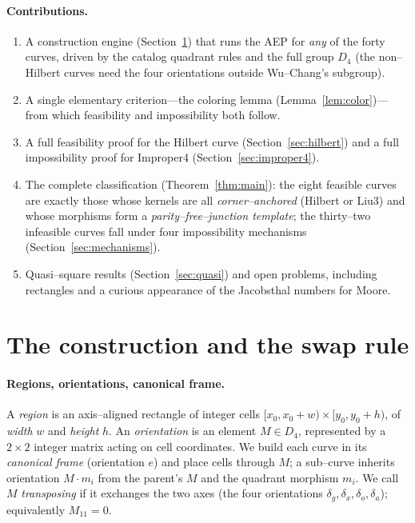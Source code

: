 \documentclass[11pt]{article}
\theoremstyle{definition}
\newcommand{\Dfour}{D_4}
\begin{document}
\paragraph{Contributions.}
\begin{enumerate}[leftmargin=*]
\item A construction engine (Section~\ref{sec:engine}) that runs the AEP for \emph{any} of
the forty curves, driven by the catalog quadrant rules and the full group $\Dfour$
(the non--Hilbert curves need the four orientations outside Wu--Chang's subgroup).
\item A single elementary criterion---the coloring lemma (Lemma~\ref{lem:color})---from
which feasibility and impossibility both follow.
\item A full feasibility proof for the Hilbert curve (Section~\ref{sec:hilbert}) and a full
impossibility proof for Improper4 (Section~\ref{sec:improper4}).
\item The complete classification (Theorem~\ref{thm:main}): the eight feasible curves are
exactly those whose kernels are all \emph{corner--anchored} (Hilbert or Liu$3$) and whose
morphisms form a \emph{parity--free--junction template}; the thirty--two infeasible curves
fall under four impossibility mechanisms (Section~\ref{sec:mechanisms}).
\item Quasi--square results (Section~\ref{sec:quasi}) and open problems, including
rectangles and a curious appearance of the Jacobsthal numbers for Moore.
\end{enumerate}

\section{The construction and the swap rule}\label{sec:engine}

\paragraph{Regions, orientations, canonical frame.} A \emph{region} is an axis--aligned
rectangle of integer cells $[x_0,x_0+w)\times[y_0,y_0+h)$, of \emph{width} $w$ and
\emph{height} $h$. An \emph{orientation} is an element $M\in\Dfour$, represented by a
$2\times2$ integer matrix acting on cell coordinates. We build each curve in its
\emph{canonical frame} (orientation $e$) and place cells through $M$; a sub--curve inherits
orientation $M\!\cdot\! m_i$ from the parent's $M$ and the quadrant morphism $m_i$. We call
$M$ \emph{transposing} if it exchanges the two axes (the four orientations
$\delta_g,\delta_x,\delta_o,\delta_a$); equivalently $M_{11}=0$.
\end{document}
